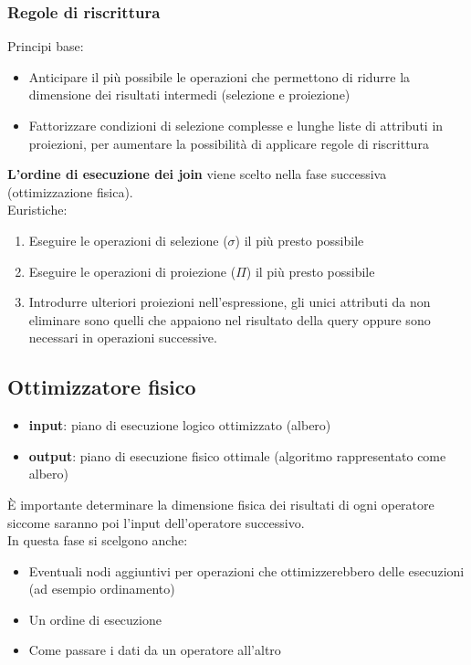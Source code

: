 \subsubsection{Regole di riscrittura}
Principi base:
\begin{itemize}
    \item Anticipare il più possibile le operazioni che permettono di ridurre la dimensione dei risultati intermedi (selezione e proiezione)
    \item Fattorizzare condizioni di selezione complesse e lunghe liste di attributi in proiezioni, per aumentare la possibilità di applicare regole di riscrittura
\end{itemize}
\textbf{L'ordine di esecuzione dei join} viene scelto nella fase successiva (ottimizzazione fisica).\\
Euristiche:
\begin{enumerate}
    \item Eseguire le operazioni di selezione ($\sigma$) il più presto possibile
    \item Eseguire le operazioni di proiezione ($\Pi$) il più presto possibile
    \item Introdurre ulteriori proiezioni nell’espressione, gli unici attributi da non eliminare sono quelli che appaiono nel risultato della query oppure sono necessari in operazioni successive.
\end{enumerate}

\subsection{Ottimizzatore fisico}
\begin{itemize}
    \item \textbf{input}: piano di esecuzione logico ottimizzato (albero)
    \item \textbf{output}: piano di esecuzione fisico ottimale (algoritmo rappresentato come albero)
\end{itemize}
\`E importante determinare la dimensione fisica dei risultati di ogni operatore siccome saranno poi l'input dell'operatore successivo.\\
In questa fase si scelgono anche:
\begin{itemize}
    \item Eventuali nodi aggiuntivi per operazioni che ottimizzerebbero delle esecuzioni (ad esempio ordinamento)
    \item Un ordine di esecuzione
    \item Come passare i dati da un operatore all'altro
\end{itemize}

